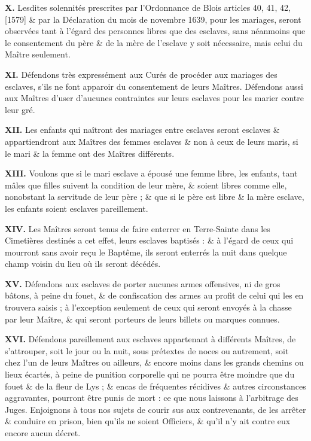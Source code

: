 \documentclass[french,twoside]{book} %
\newcommand{\labelchar}[1]{{\color{rubric}\bf #1}}
\begin{document}
\labelchar{X.} Lesdites solennités prescrites par l’Ordonnance de Blois articles 40, 41, 42, [1579] \& par la Déclaration du mois de novembre 1639, pour les mariages, seront observées tant à l’égard des personnes libres que des esclaves, sans néanmoins que le consentement du père \& de la mère de l’esclave y soit nécessaire, mais celui du Maître seulement.\par
\labelchar{XI.} Défendons très expressément aux Curés de procéder aux mariages des esclaves, s’ils ne font apparoir du consentement de leurs Maîtres. Défendons aussi aux Maîtres d’user d’aucunes contraintes sur leurs esclaves pour les marier contre leur gré.\par
\labelchar{XII.} Les enfants qui naîtront des mariages entre esclaves seront esclaves \& appartiendront aux Maîtres des femmes esclaves \& non à ceux de leurs maris, si le mari \& la femme ont des Maîtres différents.\par
\labelchar{XIII.} Voulons que si le mari esclave a épousé une femme libre, les enfants, tant mâles que filles suivent la condition de leur mère, \& soient libres comme elle, nonobstant la servitude de leur père ; \& que si le père est libre \& la mère esclave, les enfants soient esclaves pareillement.\par
\labelchar{XIV.} Les Maîtres seront tenus de faire enterrer en Terre-Sainte dans les Cimetières destinés a cet effet, leurs esclaves baptisés : \& à l’égard de ceux qui mourront sans avoir reçu le Baptême, ils seront enterrés la nuit dans quelque champ voisin du lieu où ils seront décédés.\par
\labelchar{XV.} Défendons aux esclaves de porter aucunes armes offensives, ni de gros bâtons, à peine du fouet, \& de confiscation des armes au profit de celui qui les en trouvera saisis ; à l’exception seulement de ceux qui seront envoyés à la chasse par leur Maître, \& qui seront porteurs de leurs billets ou marques connues.\par
\labelchar{XVI.} Défendons pareillement aux esclaves appartenant à différents Maîtres, de s’attrouper, soit le jour ou la nuit, sous prétextes de noces ou autrement, soit chez l’un de leurs Maîtres ou ailleurs, \& encore moins dans les grands chemins ou lieux écartés, à peine de punition corporelle qui ne pourra être moindre que du fouet \& de la fleur de Lys ; \& encas de fréquentes récidives \& autres circonstances aggravantes, pourront être punis de mort : ce que nous laissons à l’arbitrage des Juges. Enjoignons à tous nos sujets de courir sus aux contrevenants, de les arrêter \& conduire en prison, bien qu’ils ne soient Officiers, \& qu’il n’y ait contre eux encore aucun décret.\par
\end{document}
